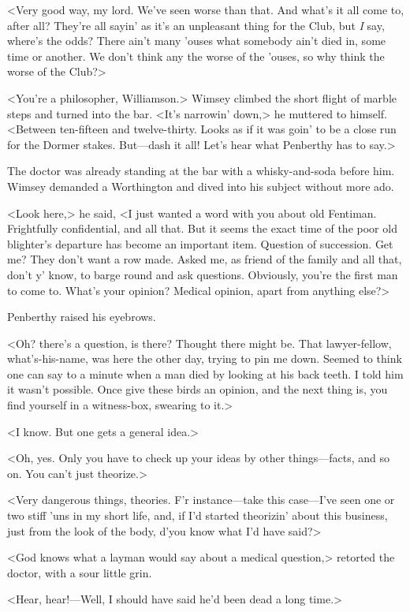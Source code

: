 <Very good way, my lord. We've seen worse than that. And what's it all come to, after all? They're all sayin' as it's an unpleasant thing for the Club, but \emph{I} say, where's the odds? There ain't many 'ouses what somebody ain't died in, some time or another. We don't think any the worse of the 'ouses, so why think the worse of the Club?>

<You're a philosopher, Williamson.> Wimsey climbed the short flight of marble steps and turned into the bar. <It's narrowin' down,> he muttered to himself. <Between ten-fifteen and twelve-thirty. Looks as if it was goin' to be a close run for the Dormer stakes. But—dash it all! Let's hear what Penberthy has to say.>

The doctor was already standing at the bar with a whisky-and-soda before him. Wimsey demanded a Worthington and dived into his subject without more ado.

<Look here,> he said, <I just wanted a word with you about old Fentiman. Frightfully confidential, and all that. But it seems the exact time of the poor old blighter's departure has become an important item. Question of succession. Get me? They don't want a row made. Asked me, as friend of the family and all that, don't y' know, to barge round and ask questions. Obviously, you're the first man to come to. What's your opinion? Medical opinion, apart from anything else?>

Penberthy raised his eyebrows.

<Oh? there's a question, is there? Thought there might be. That lawyer-fellow, what's-his-name, was here the other day, trying to pin me down. Seemed to think one can say to a minute when a man died by looking at his back teeth. I told him it wasn't possible. Once give these birds an opinion, and the next thing is, you find yourself in a witness-box, swearing to it.>

<I know. But one gets a general idea.>

<Oh, yes. Only you have to check up your ideas by other things—facts, and so on. You can't just theorize.>

<Very dangerous things, theories. F'r instance—take this case—I've seen one or two stiff 'uns in my short life, and, if I'd started theorizin' about this business, just from the look of the body, d'you know what I'd have said?>

<God knows what a layman would say about a medical question,> retorted the doctor, with a sour little grin.

<Hear, hear!—Well, I should have said he'd been dead a long time.>

